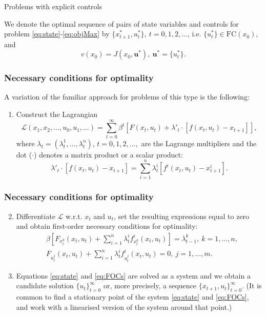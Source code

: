\documentclass[10pt]{beamer}
\theoremstyle{definition}
\begin{document}
\begin{section}{Problems with explicit controls}
\begin{frame}[fragile]
We denote the optimal sequence of pairs of state variables and controls for problem \eqref{eq:state}-\eqref{eq:objMax} by $\{x^*_{t+1},u^*_t\},~t=0,1,2,\ldots$, i.e. $\{u^*_t\} \in \textrm{FC}(x_0)$, and $$v(x_0)=J(x_0,\mathbf{u^*}),~\mathbf{u^*}=\{u^*_t\}.$$
\end{frame}



\begin{frame}[fragile]
\frametitle{Necessary conditions for optimality}
A variation of the familiar approach for problems of this type is the following:\begin{enumerate}
\item Construct the Lagrangian
\[\mathcal{L}(x_1,x_2,\ldots,u_0,u_1,\ldots) =
 \sum_{t=0}^{\infty}\beta^t \left[ F(x_t,u_t) + \lambda'_t \cdot
[f(x_t,u_t)-x_{t+1}] \right],  \] where $\lambda_t=(\lambda^1_t,\ldots,\lambda^n_t)$, $t=0,1,2,\ldots,$ are the Lagrange multipliers and the dot ($ \cdot $) denotes a matrix product or a scalar product: $$\lambda'_t \cdot [f(x_t,u_t)-x_{t+1}]
= \sum_{i=1}^n \lambda_t^i [f^i(x_t,u_t)-x^i_{t+1}].$$
\end{enumerate}
\end{frame}



\begin{frame}[fragile]
\frametitle{Necessary conditions for optimality}
\begin{enumerate} \setcounter{enumi}{1}
\item Differentiate $\mathcal{L}$ w.r.t. $x_t$ and $u_t$, set the resulting expressions equal to zero and obtain first-order necessary conditions for optimality: \begin{equation}\begin{split}
& \beta \left[ F_{x_t^k}(x_t,u_t)+\sum_{i=1}^n \lambda_t^i f^i_{x_t^k}(x_t,u_t)\right] = \lambda^k_{t-1},~ k=1,\ldots,n, \\
& F_{u_t^j}(x_t,u_t)+ \sum_{i=1}^n \lambda_t^i f^i_{u_t^j}(x_t,u_t) = 0,~ j=1,\ldots,m.
\end{split}
\label{eq:FOCs}
\end{equation}
\item Equations \eqref{eq:state} and \eqref{eq:FOCs} are solved as a system and we obtain a candidate solution $\{u_t\}_{t=0}^\infty$ or, more precisely, a sequence
$\{x_{t+1},u_t\}_{t=0}^\infty$. (It is common to find a stationary point of the system \eqref{eq:state} and \eqref{eq:FOCs}, and work with a linearised version of the system around that point.)
\end{enumerate}
\end{frame}



\end{section}
\end{document}
